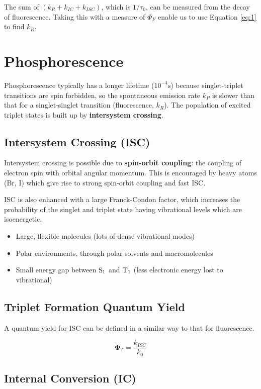 \documentclass[a4paper]{tufte-handout}
\theoremstyle{definition}
\begin{document}
The sum of $(k_R + k_{IC} + k_{ISC})$, which is $1/\tau_0$, can be measured from the decay of fluorescence.
Taking this with a measure of $\Phi_F$ enable us to use Equation \ref{eq:1} to find $k_R$.

\section{Phosphorescence}

Phosphorescence typically has a longer lifetime ($10^{-4} \mathrm{s}$) because singlet-triplet transitions are spin forbidden, so the spontaneous
emission rate $k_P$ is slower than that for a singlet-singlet transition (fluorescence, $k_R$). The population of excited triplet states 
is built up by \textbf{intersystem crossing}.

\subsection*{Intersystem Crossing (ISC)}
Intersystem crossing is possible due to \textbf{spin-orbit coupling}: the coupling of electron spin
with orbital angular momentum. This is encouraged by heavy atoms (Br, I) which give rise to strong spin-orbit coupling and fast ISC.

ISC is also enhanced with a large Franck-Condon factor, which increases the probability of the singlet and triplet state having vibrational levels which are
isoenergetic.
\begin{itemize}
  \item Large, flexible molecules (lots of dense vibrational modes)
  \item Polar environments, through polar solvents and macromolecules
  \item Small energy gap between $\ce{S1}$ and $\ce{T1}$ (less electronic energy lost to vibrational)
\end{itemize}

\subsection*{Triplet Formation Quantum Yield}

A quantum yield for ISC can be defined in a similar way to that for fluorescence.

$$\mathbf{\Phi}_T = \frac{k_{ISC}}{k_0}$$

\subsection*{Internal Conversion (IC)}
\end{document}
